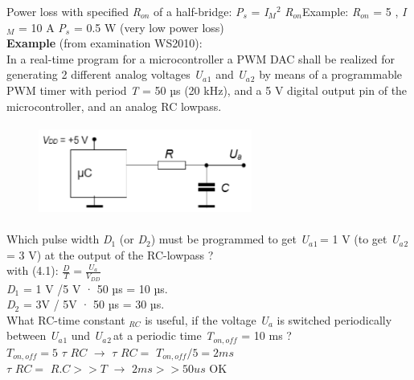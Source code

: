 Power loss with specified \textit{R${}_{on}$} of a half-bridge:     \textit{P${}_{s}$ }= \textit{I${}_{M}$}${}^{2}$ \textit{R${}_{on}$}Example: \textit{R${}_{on}$} = 5 , \textit{I${}_{M}$} = 10 A  \textit{P${}_{s}$} = 0.5 W    (very low power loss)\\

\textbf{Example} (from examination WS2010):\\

In a real-time program for a microcontroller a PWM DAC shall be realized for generating 2 different analog voltages \textit{U${}_{a}$}${}_{1}$ and \textit{U${}_{a}$}${}_{2}$ by means of a programmable PWM timer with period \textit{T} = 50 µs (20 kHz), and a 5 V digital output pin of the microcontroller, and an analog RC lowpass.

    \begin{figure}[h]
    \centering
    \includegraphics[width=7cm, height=3cm]{Images/image172.png}
    \label{fig:Fig }
    \end{figure}

Which pulse width \textit{D}${}_{1}$ (or \textit{D}${}_{2}$) must be programmed to get \textit{U${}_{a}$}${}_{1\ }$= 1 V (to get \textit{U${}_{a}$}${}_{2\ }$= 3 V) at the output of the RC-lowpass ?\\

with (4.1):  \textit{$\frac{D}{T} =\frac{U_{a} }{V_{DD} } $}  \\

\textit{D}${}_{1}$ = 1 V /5 V · 50 µs = 10 µs.  \\
\textit{D}${}_{2}$ = 3V / 5V · 50 µs = 30 µs.  \\  

What RC-time constant \textit{${}_{RC}$} is useful, if the voltage \textit{U${}_{a}$} is switched periodically between \textit{U${}_{a}$}${}_{1}$ und \textit{U${}_{a}$}${}_{2\ }$at a periodic time \textit{T${}_{on,off}$}  = 10 ms ? \\ 

$T_{on,off}=5$ $\tau$ $RC$ \hspace{1cm} $\rightarrow$ $\tau$ $RC=$  $T_{on,off}/5=2ms$ \\
$\tau$ $RC=$ $R.C >>T$ \hspace{0.80cm} $\rightarrow$ $2ms >> 50 us$ OK\\

